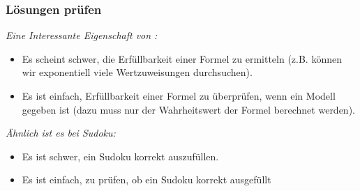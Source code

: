 \documentclass[onlymath]{beamer}
\begin{document}
\begin{frame}\frametitle{Lösungen prüfen}

\emph{Eine Interessante Eigenschaft von :}
\begin{itemize}
\item Es scheint schwer, die Erfüllbarkeit einer Formel zu ermitteln (z.B. können wir exponentiell viele
	Wertzuweisungen durchsuchen).
\item Es ist einfach, Erfüllbarkeit einer Formel zu überprüfen, wenn ein Modell gegeben ist (dazu muss nur der Wahrheitswert der Formel berechnet werden).
\end{itemize}\pause

\emph{Ähnlich ist es bei Sudoku:}
\begin{itemize}
\item Es ist schwer, ein Sudoku korrekt auszufüllen.
\item Es ist einfach, zu prüfen, ob ein Sudoku korrekt ausgefüllt 
\end{itemize}\pause


\end{frame}
\end{document}
